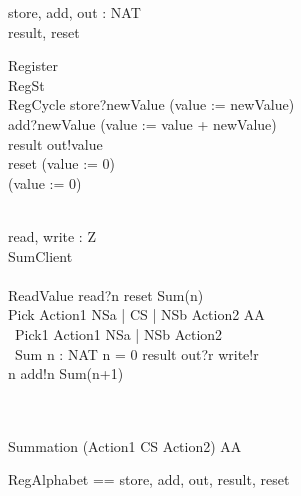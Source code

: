 \documentclass{llncs}
\begin{document}
\begin{circus}
\circchannel store, add, out : NAT\\
\circchannel result, reset\\
\end{circus}
\begin{circus}
\circprocess Register \circdef\\
	\circbegin \circstate RegSt \\
	RegCycle \circdef store?newValue \then (value := newValue)\\
	\extchoice add?newValue \then (value := value + newValue)\\
	\extchoice result \then out!value \then \Skip\\
	\extchoice reset \then (value := 0)\\
\circspot (value := 0) \\
	\circend\\
\end{circus}
\begin{circus}
\circchannel read, write : Z\\
\circprocess SumClient \circdef\\
	\circbegin\\
	ReadValue \circdef read?n \then reset \then Sum(n)\\
	Pick \circdef Action1 \lpar NSa | CS | NSb \rpar Action2 \circhide AA\\\
	Pick1 \circdef Action1 \linter NSa | NSb \rinter Action2 \\\
	Sum \circdef n : NAT \circspot \lcircguard n = 0 \rcircguard \circguard result \then out?r \then write!r \then \Skip\\
	\extchoice \lcircguard n \neq 0 \rcircguard \circguard add!n \then Sum(n+1)\\
	\circspot \Skip\\
	\circend\\

\end{circus}
\begin{circus}
\circprocess Summation \circdef (Action1 \lpar CS \rpar Action2) \circhide AA
\end{circus}
\begin{circus}
\circchannelset RegAlphabet == \lchanset store, add, out, result, reset \rchanset\\
\end{circus}
\end{document}
